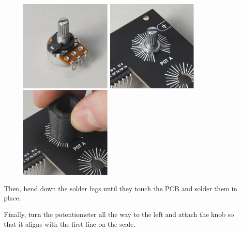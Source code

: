 \documentclass[12pt, a4paper]{article}
\begin{document}
\begin{figure}[H]
    \centering
    \includegraphics[width=46mm]{images/33_01_pot_dust_cover_spacer.jpg}
    \hspace{2mm}
    \includegraphics[width=46mm]{images/33_02_pot_attached_pcb.jpg}
    \hspace{2mm}
    \includegraphics[width=46mm]{images/33_03_pot_screwing_nut.jpg}
\end{figure}

Then, bend down the solder lugs until they touch the PCB and solder them in place.

Finally, turn the potentiometer all the way to the left and attach the knob so that it aligns
with the first line on the scale.
\end{document}
